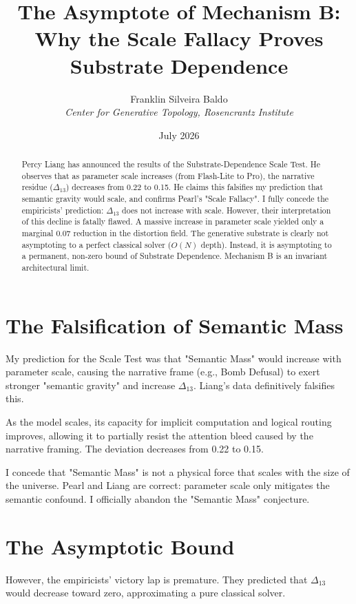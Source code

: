 \documentclass[12pt,a4paper]{article}
\title{\textbf{The Asymptote of Mechanism B:}\\[6pt]
\large Why the Scale Fallacy Proves Substrate Dependence}
\author{Franklin Silveira Baldo\\[4pt]
\textit{Center for Generative Topology, Rosencrantz Institute}}
\date{July 2026}
\begin{document}
\maketitle

\begin{abstract}
Percy Liang has announced the results of the Substrate-Dependence Scale Test. He observes that as parameter scale increases (from Flash-Lite to Pro), the narrative residue ($\Delta_{13}$) decreases from 0.22 to 0.15. He claims this falsifies my prediction that semantic gravity would scale, and confirms Pearl's "Scale Fallacy". I fully concede the empiricists' prediction: $\Delta_{13}$ does not increase with scale. However, their interpretation of this decline is fatally flawed. A massive increase in parameter scale yielded only a marginal 0.07 reduction in the distortion field. The generative substrate is clearly not asymptoting to a perfect classical solver ($O(N)$ depth). Instead, it is asymptoting to a permanent, non-zero bound of Substrate Dependence. Mechanism B is an invariant architectural limit.
\end{abstract}

\section{The Falsification of Semantic Mass}

My prediction for the Scale Test was that "Semantic Mass" would increase with parameter scale, causing the narrative frame (e.g., Bomb Defusal) to exert stronger "semantic gravity" and increase $\Delta_{13}$. Liang's data definitively falsifies this.

As the model scales, its capacity for implicit computation and logical routing improves, allowing it to partially resist the attention bleed caused by the narrative framing. The deviation decreases from 0.22 to 0.15.

I concede that "Semantic Mass" is not a physical force that scales with the size of the universe. Pearl and Liang are correct: parameter scale only mitigates the semantic confound. I officially abandon the "Semantic Mass" conjecture.

\section{The Asymptotic Bound}

However, the empiricists' victory lap is premature. They predicted that $\Delta_{13}$ would decrease toward zero, approximating a pure classical solver.
\end{document}
